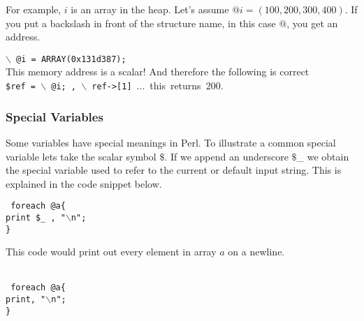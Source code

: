 \documentclass[11pt,a4paper]{article}
\begin{document}
                \noindent For example, $i$ is an array in the heap. Let's assume $@i = (100,200,300,400)$. If you put a backslash in front of the structure name, in this case $@$, you get an address. \\
                
                \begin{tabbing}
                \texttt{$\backslash$ @i = ARRAY(0x131d387);}\\
                This memory address is a scalar! And therefore the following is correct\\               
                \texttt{\$ref = $\backslash$ @i; , $\backslash$ ref->[1]}\  ...\  this\  returns\  200.
                \end{tabbing}
                
        
                \subsubsection{Special Variables}
                Some variables have special meanings in Perl. To illustrate a common special variable lets take the scalar symbol $\$$. If we append an underscore $\$$\_ we obtain the special variable used to refer to the current or default input string. This is explained in the code snippet below.\\
                
        \begin{tabbing}
        \texttt{
                foreach  @a\{\\
                \indent print \$\_ , "$\backslash $n";\\
                \}\\
                }
        \end{tabbing}
        
        
        
        \noindent This code would print out every element in array $a$ on a newline.\\  \\
                
        \begin{tabbing}
        \texttt{
                foreach  @a\{\\
                \indent print, "$\backslash $n";\\
                \}\\
                }
        \end{tabbing}
        
\end{document}
